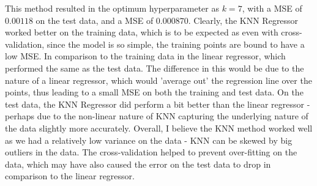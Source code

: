 \documentclass{scrartcl}
\begin{document}
This method resulted in the optimum hyperparameter as $k = 7$, with a MSE of $0.00118$ on the test data, and a MSE of $0.000870$. Clearly, the KNN Regressor worked better on the training data, which is to be expected as even with cross-validation, since the model is so simple, the training points are bound to have a low MSE. In comparison to the training data in the linear regressor, which performed the same as the test data. The difference in this would be due to the nature of a linear regressor, which would 'average out' the regression line over the points, thus leading to a small MSE on both the training and test data. On the test data, the KNN Regressor did perform a bit better than the linear regressor - perhaps due to the non-linear nature of KNN capturing the underlying nature of the data slightly more accurately. Overall, I believe the KNN method worked well as we had a relatively low variance on the data - KNN can be skewed by big outliers in the data. The cross-validation helped to prevent over-fitting on the data, which may have also caused the error on the test data to drop in comparison to the linear regressor.

%
\end{document}
